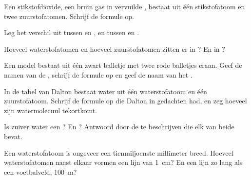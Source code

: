 \begin{exercise}[$\star$]\label{exo:g7:atoms-and-molecules:5}
Een  stikstofdioxide, een bruin gas in vervuilde , bestaat
uit één stikstofatoom en twee zuurstofatomen. Schrijf de formule op.
\end{exercise}

\begin{exercise}[$\star\star$]\label{exo:g7:atoms-and-molecules:6}
Leg het verschil uit tussen  en , en tussen  en
.
\end{exercise}

\begin{exercise}[$\star\star$]\label{exo:g7:atoms-and-molecules:7}
Hoeveel waterstofatomen en hoeveel zuurstofatomen zitten er in
? En in ?
\end{exercise}

\begin{exercise}[$\star\star$]\label{exo:g7:atoms-and-molecules:8}
Een model bestaat uit één zwart balletje met twee rode balletjes eraan.
Geef de namen van de , schrijf de formule op en geef de naam van
het .
\end{exercise}

\begin{exercise}[$\star\star$]\label{exo:g7:atoms-and-molecules:9}
In de tabel van Dalton bestaat water uit één waterstofatoom en één
zuurstofatoom. Schrijf de formule op die Dalton in gedachten had, en zeg
hoeveel  zijn watermolecuul tekortkomt.
\end{exercise}

\begin{exercise}[$\star\star$]\label{exo:g7:atoms-and-molecules:10}
Is zuiver water een ? En ? Antwoord door de  te
beschrijven die elk van beide bevat.
\end{exercise}

\begin{exercise}[$\star\star\star$]\label{exo:g7:atoms-and-molecules:11}
Een waterstofatoom is ongeveer een tienmiljoenste millimeter breed.
Hoeveel waterstofatomen naast elkaar vormen een lijn van \qty{1}{cm}?
En een lijn zo lang als een voetbalveld, \qty{100}{m}?
\end{exercise}

